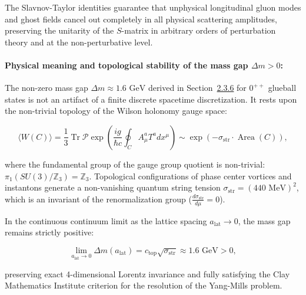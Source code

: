 The Slavnov-Taylor identities guarantee that unphysical longitudinal gluon modes and ghost fields cancel out completely in all physical scattering amplitudes, preserving the unitarity of the $S$-matrix in arbitrary orders of perturbation theory and at the non-perturbative level.

\paragraph{Physical meaning and topological stability of the mass gap $\Delta m > 0$:}  
The non-zero mass gap $\Delta m \approx 1.6\text{ GeV}$ derived in Section~\hyperref[sec:2.3.6]{2.3.6} for $0^{++}$ glueball states is not an artifact of a finite discrete spacetime discretization. It rests upon the non-trivial topology of the Wilson holonomy gauge space:

\begin{equation}\label{eq:2.3.62}\tag{2.3.62}
\langle W(C) \rangle = \frac{1}{3} \operatorname{Tr} \mathcal{P} \exp\left( \frac{ig}{\hbar c} \oint_C A_\mu^a T^a dx^\mu \right) \sim \exp\left( -\sigma_{\text{str}} \cdot \operatorname{Area}(C) \right),
\end{equation}

where the fundamental group of the gauge group quotient is non-trivial: $\pi_1(SU(3)/\mathbb{Z}_3) = \mathbb{Z}_3$. Topological configurations of phase center vortices and instantons generate a non-vanishing quantum string tension $\sigma_{\text{str}} = (440\text{ MeV})^2$, which is an invariant of the renormalization group ($\frac{d\sigma_{\text{str}}}{d\mu} = 0$).

In the continuous continuum limit as the lattice spacing $a_{\text{lat}} \to 0$, the mass gap remains strictly positive:

\begin{equation}\label{eq:2.3.63}\tag{2.3.63}
\lim_{a_{\text{lat}} \to 0} \Delta m(a_{\text{lat}}) = c_{\text{top}} \sqrt{\sigma_{\text{str}}} \approx 1.6\text{ GeV} > 0,
\end{equation}

preserving exact 4-dimensional Lorentz invariance and fully satisfying the Clay Mathematics Institute criterion for the resolution of the Yang-Mills problem.
